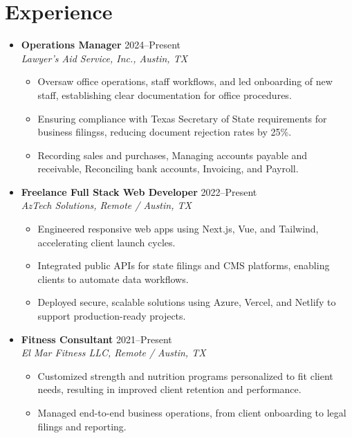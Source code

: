 \documentclass[letterpaper,10pt]{article}
\newcommand{\resumeItem}[1]{\item \small{#1}}
\begin{document}
\section*{Experience}
\begin{itemize}
  \item[]
    \textbf{Operations Manager} \hfill 2024–Present \\
    \textit{Lawyer's Aid Service, Inc., Austin, TX}
    \begin{itemize}[leftmargin=0.15in]
      \resumeItem{Oversaw office operations, staff workflows, and led onboarding of new staff, establishing clear documentation for office procedures.}
      \resumeItem{Ensuring compliance with Texas Secretary of State requirements for business filingss, reducing document rejection rates by 25\%.}
      \resumeItem{Recording sales and purchases, Managing accounts payable and receivable, Reconciling bank accounts, Invoicing, and Payroll.}
    \end{itemize}

  \item[]
    \textbf{Freelance Full Stack Web Developer} \hfill 2022–Present \\
    \textit{AzTech Solutions, Remote / Austin, TX}
    \begin{itemize}[leftmargin=0.15in]
      \resumeItem{Engineered responsive web apps using Next.js, Vue, and Tailwind, accelerating client launch cycles.}
      \resumeItem{Integrated public APIs for state filings and CMS platforms, enabling clients to automate data workflows.}
      \resumeItem{Deployed secure, scalable solutions using Azure, Vercel, and Netlify to support production-ready projects.}
    \end{itemize}

  \item[]
    \textbf{Fitness Consultant} \hfill 2021–Present \\
    \textit{El Mar Fitness LLC, Remote / Austin, TX}
    \begin{itemize}[leftmargin=0.15in]
      \resumeItem{Customized strength and nutrition programs personalized to fit client needs, resulting in improved client retention and performance.}
      \resumeItem{Managed end-to-end business operations, from client onboarding to legal filings and reporting.}
    \end{itemize}
\end{itemize}

\end{document}
